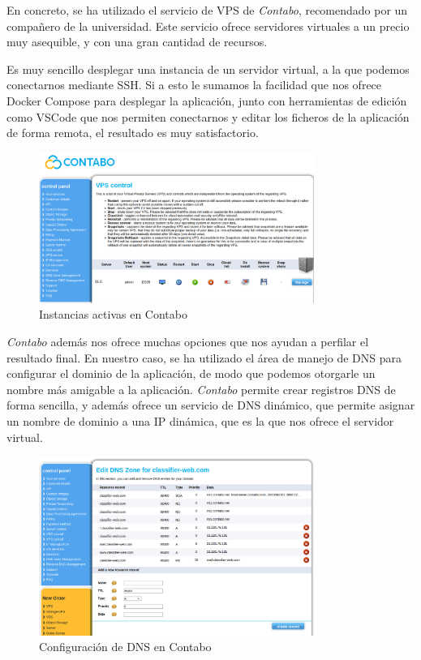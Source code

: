 En concreto, se ha utilizado el servicio de VPS de \textit{Contabo}, recomendado por un compañero de la universidad.
Este servicio ofrece servidores virtuales a un precio muy asequible, y con una gran cantidad de recursos.

Es muy sencillo desplegar una instancia de un servidor virtual, a la que podemos conectarnos mediante SSH.
Si a esto le sumamos la facilidad que nos ofrece Docker Compose para desplegar la aplicación, junto con herramientas de edición como VSCode que nos permiten conectarnos y editar los ficheros de la aplicación de forma remota, el resultado es muy satisfactorio.

\begin{figure}[htpb]
    \centering
    \includegraphics[width=0.8\textwidth]{cap3/images/contabo-instance.png}
    \caption{Instancias activas en Contabo}
    \label{fig:contabo}
\end{figure}

\textit{Contabo} además nos ofrece muchas opciones que nos ayudan a perfilar el resultado final.
En nuestro caso, se ha utilizado el área de manejo de DNS para configurar el dominio de la aplicación, de modo que podemos otorgarle un nombre más amigable a la aplicación.
\textit{Contabo} permite crear registros DNS de forma sencilla, y además ofrece un servicio de DNS dinámico, que permite asignar un nombre de dominio a una IP dinámica, que es la que nos ofrece el servidor virtual.

\begin{figure}[htpb]
    \centering
    \includegraphics[width=0.8\textwidth]{cap3/images/contabo-dns.png}
    \caption{Configuración de DNS en Contabo}
    \label{fig:contabo-dns}
\end{figure}

